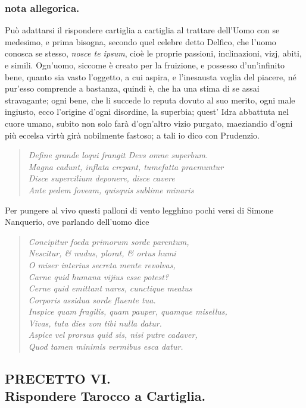 \documentclass[11pt,a6paper]{article}
\newcommand{\literaryquote}[1]{%
\kern -6pt  \begin{verse}
    {\footnotesize \it #1}
  \end{verse}\kern -2pt%
}
\begin{document}
\subsubsection{nota allegorica.}
{\footnotesize
Può adattarsi il rispondere cartiglia a cartiglia
al trattare dell'Uomo con se medesimo, e prima
bisogna, secondo quel celebre detto Delfico, che
l'uomo conosca se stesso, \textit{nosce te ipsum}, cioè le
proprie passioni, inclinazioni, vizj, abiti, e simili.
Ogn'uomo, siccome è creato per la fruizione, e
possesso d'un'infinito bene, quanto sia vasto
l'oggetto, a cui aspira, e l'inesausta voglia del piacere,
né pur'esso comprende a bastanza, quindi è, che ha
una stima di se assai stravagante; ogni bene, che li
succede lo reputa dovuto al suo merito, ogni male
ingiusto, ecco l'origine d'ogni disordine, la superbia;
quest' Idra abbattuta nel cuore umano, subito
non solo farà d'ogn'altro vizio purgato, maeziandio
d'ogni più eccelsa virtù girà nobilmente fastoso;
a tali io dico con Prudenzio.
\literaryquote{Define grande loqui frangit Devs omne superbum.\\
Magna cadunt, inflata crepant, tumefatta praemuntur\\
Disce supercilium deponere, disce cavere \\
Ante pedem foveam, quisquis sublime minaris}

Per pungere al vivo questi palloni di vento legghino
pochi versi di Simone Nanquerio, ove parlando
dell'uomo dice
\literaryquote{Concipitur foeda primorum sorde parentum,\\
Nescitur, \& nudus, plorat, \& ortus humi\\
O miser interius secreta mente revolvas,\\
Carne quid humana vijius esse potest?\\
Cerne quid emittant nares, cunctique meatus\\
Corporis assidua sorde fluente tua.\\
Inspice quam fragilis, quam pauper, quamque misellus, \\
Vivas, tuta dies von tibi nulla datur.\\
Aspice vel prorsus quid sis, nisi putre cadaver, \\
Quod tamen minimis vermibus esca datur.
}
}
\subsection{PRECETTO VI.\\
 \footnotesize Rispondere Tarocco a Cartiglia.}
\end{document}
